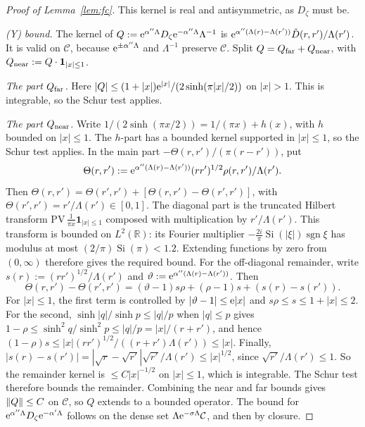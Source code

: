 \begin{proof}[Proof of Lemma~\ref{lem:fc}]
This kernel is real and antisymmetric, as $D_\zeta$ must be.

\medskip\noindent\emph{(Y) bound.} The kernel of $Q:=\mathrm{e}^{\alpha''\Lambda}D_\zeta\mathrm{e}^{-\alpha''\Lambda}\Lambda^{-1}$ is $\mathrm{e}^{\alpha''(\Lambda(r)-\Lambda(r'))}\tilde D(r,r')/\Lambda(r')$. It is valid on $\mathcal C$, because $\mathrm{e}^{\pm\alpha''\Lambda}$ and $\Lambda^{-1}$ preserve $\mathcal C$. Split $Q=Q_{\rm far}+Q_{\rm near}$, with $Q_{\rm near}:=Q\cdot\mathbf 1_{|x|\le1}$.

\emph{The part $Q_{\rm far}$.} Here $|Q|\le(1+|x|)\mathrm{e}^{|x|}/(2\sinh(\pi|x|/2))$ on $|x|>1$. This is integrable, so the Schur test applies.

\emph{The part $Q_{\rm near}$.} Write $1/(2\sinh(\pi x/2))=1/(\pi x)+h(x)$, with $h$ bounded on $|x|\le1$.
The $h$-part has a bounded kernel supported in $|x|\le1$, so the Schur test applies.
In the main part $-\Theta(r,r')/(\pi(r-r'))$, put
\[\Theta(r,r'):=\mathrm{e}^{\alpha''(\Lambda(r)-\Lambda(r'))}(rr')^{1/2}\rho(r,r')/\Lambda(r').\]
Then $\Theta(r,r')=\Theta(r',r')+[\Theta(r,r')-\Theta(r',r')]$, with $\Theta(r',r')=r'/\Lambda(r')\in[0,1]$.
The diagonal part is the truncated Hilbert transform $\mathrm{PV}\,\frac{1}{\pi x}\mathbf 1_{|x|\le1}$
composed with multiplication by $r'/\Lambda(r')$. This transform is bounded on $L^2(\mathbb R)$:
its Fourier multiplier $-\tfrac{2i}{\pi}\operatorname{Si}(|\xi|)\operatorname{sgn}\xi$ has modulus
at most $(2/\pi)\operatorname{Si}(\pi)<1.2$. Extending functions by zero from $(0,\infty)$ therefore gives the required bound.
For the off-diagonal remainder, write $s(r):=(rr')^{1/2}/\Lambda(r')$ and
$\vartheta:=\mathrm{e}^{\alpha''(\Lambda(r)-\Lambda(r'))}$. Then
\[
\Theta(r,r')-\Theta(r',r')=(\vartheta-1)s\rho+(\rho-1)s+(s(r)-s(r')).
\]
For $|x|\le1$, the first term is controlled by $|\vartheta-1|\le\mathrm{e}|x|$ and
$s\rho\le s\le1+|x|\le2$. For the second, $\sinh|q|/\sinh p\le|q|/p$ when $|q|\le p$ gives
$1-\rho\le\sinh^2q/\sinh^2p\le|q|/p=|x|/(r+r')$, and hence
$(1-\rho)s\le|x|(rr')^{1/2}/((r+r')\Lambda(r'))\le|x|$.
Finally, $|s(r)-s(r')|=|\sqrt r-\sqrt{r'}|\sqrt{r'}/\Lambda(r')\le|x|^{1/2}$,
since $\sqrt{r'}/\Lambda(r')\le1$.
So the remainder kernel is $\le C|x|^{-1/2}$ on $|x|\le1$, which is integrable. The Schur test therefore bounds the remainder.
Combining the near and far bounds gives $\lVert Q\rVert\le C$ on $\mathcal C$, so $Q$ extends to a bounded operator. The bound for $\mathrm{e}^{\alpha''\Lambda}D_\zeta\mathrm{e}^{-\alpha'\Lambda}$ follows on the dense set $\Lambda\mathrm{e}^{-\sigma\Lambda}\mathcal C$, and then by closure. \qedhere
\end{proof}



